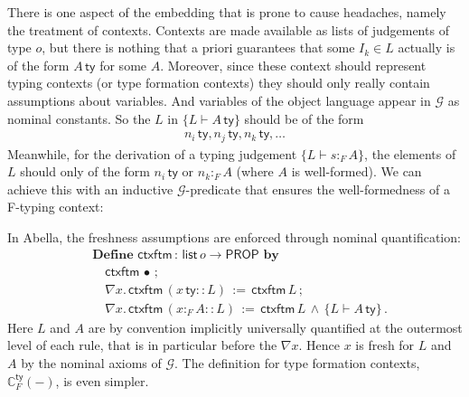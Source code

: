 \documentclass[a4paper,UKenglish]{lipics-v2016}
\newcommand{\ms}{\,}
\newcommand{\mrel}[1]{\mathrel{\ms #1 \ms}}
\newcommand{\Prop}{\ensuremath{\mathsf{PROP}}}
\newcommand{\OF}{\mrel{:}}
\newcommand{\mAnd}{\mrel{\wedge}}
\newcommand{\eqdef}{\mrel{:=}}
\newcommand{\ty}{\mathsf{ty}}
\newcommand{\tm}{\mathsf{tm}}
\newcommand{\istyFh}[1]{\ensuremath{#1\ms\mathsf{ty}}}
\newcommand{\typingFh}[2]{\ensuremath{#1 \mathbin{:_{F}} #2}}
\newcommand{\emptyctx}{\ensuremath{\bullet}}
\theoremstyle{plain}
\begin{document}
There is one aspect of the embedding that is prone to cause headaches, namely the treatment of contexts.
Contexts are made available as lists of judgements of type $o$, but there is nothing that a priori guarantees that some $I_k \in L$ actually is of the form $\istyFh A$ for some $A$.
Moreover, since these context should represent typing contexts (or type formation contexts) they should only really contain assumptions about variables.
And variables of the object language appear in $\mathcal{G}$ as nominal constants.
So the $L$ in $\{L \vdash \istyFh{A}\}$ should be of the form
\begin{align*}
  \istyFh{n_i}, \istyFh{n_j}, \istyFh{n_k}, \ldots
\end{align*}
Meanwhile, for the derivation of a typing judgement $\{L \vdash \typingFh{s}{A}\}$, the elements of $L$ should only of the form $\istyFh{n_i}$ or $\typingFh{n_k}{A}$ (where $A$ is well-formed).
We can achieve this with an inductive $\mathcal{G}$-predicate that ensures the well-formedness of a F-typing context:
\newcommand{\ac}[3]{\ensuremath{\mathbb{C}_{#1}^{#2} (#3)}}
\newcommand{\acFty}[1]{\ac{F}{\ty}{#1}}
\newcommand{\acFtm}[1]{\ac{F}{\tm}{#1}}
In Abella, the freshness assumptions are enforced through nominal quantification:
\begin{align*}
  &\mathbf{Define}\ms\ms\mathsf{ctxftm} \OF \mathsf{list}\,o \to \Prop \ms\ms\mathbf{by}\\
  &\quad\mathsf{ctxftm}\ms\emptyctx\ms;\\
  &\quad\nabla x. \ms \mathsf{ctxftm}\ms (\istyFh{x} \mathbin{::} L) \eqdef \mathsf{ctxftm}\ms L \ms;\\
  &\quad\nabla x. \ms \mathsf{ctxftm}\ms (\typingFh{x}{A} \mathbin{::} L) \eqdef \mathsf{ctxftm}\ms L \mAnd \{L \vdash \istyFh{A}\}\ms.
\end{align*}
Here $L$ and $A$ are by convention implicitly universally quantified at the outermost level of each rule, that is in particular before the $\nabla x$.
Hence $x$ is fresh for $L$ and $A$ by the nominal axioms of $\mathcal{G}$.
The definition for type formation contexts, \acFty{-}, is even simpler.
\end{document}
